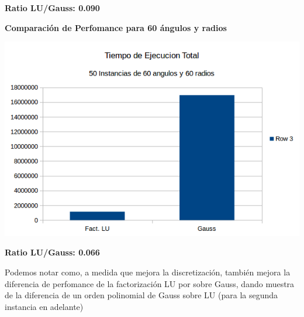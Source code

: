  \textbf{Ratio LU/Gauss: 0.090}

  	\textbf{Comparaci\'on de Perfomance para 60 \'angulos y radios }\\
\begin{center}
\includegraphics[scale=0.7]{experimentos2a_2b/2b6060.png}
\end{center}

 \textbf{Ratio LU/Gauss: 0.066}

Podemos notar como, a medida que mejora la discretizaci\'on, tambi\'en mejora la diferencia de perfomance de la factorizaci\'on LU por sobre Gauss, dando muestra de la diferencia de un orden polinomial de Gauss sobre LU (para la segunda instancia en adelante)

